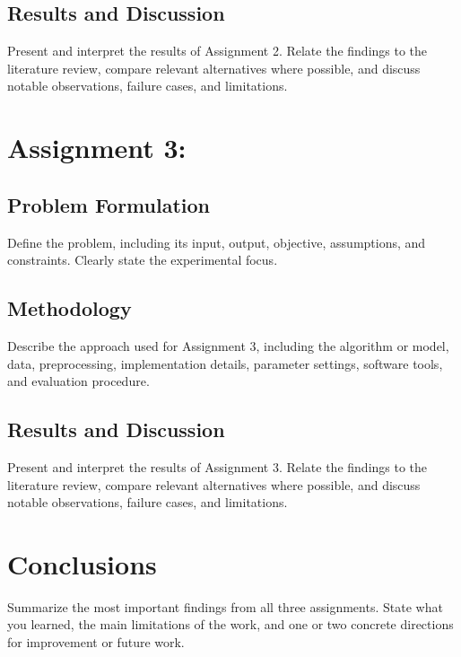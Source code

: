 \documentclass{ai-lab-report}
\begin{document}
\subsection{Results and Discussion}
Present and interpret the results of Assignment 2. Relate the findings to the literature review, compare relevant alternatives where possible, and discuss notable observations, failure cases, and limitations.

\section{Assignment 3: }

\subsection{Problem Formulation}
Define the problem, including its input, output, objective, assumptions, and constraints. Clearly state the experimental focus.

\subsection{Methodology}
Describe the approach used for Assignment 3, including the algorithm or model, data, preprocessing, implementation details, parameter settings, software tools, and evaluation procedure.

\subsection{Results and Discussion}
Present and interpret the results of Assignment 3. Relate the findings to the literature review, compare relevant alternatives where possible, and discuss notable observations, failure cases, and limitations.

\section{Conclusions}
Summarize the most important findings from all three assignments. State what you learned, the main limitations of the work, and one or two concrete directions for improvement or future work.



\end{document}
